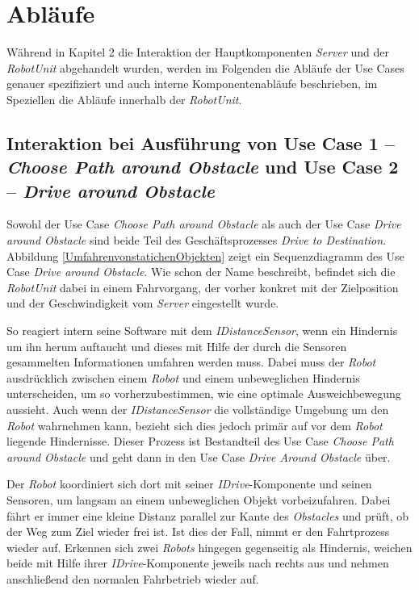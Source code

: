 \section{Abläufe}

Während in Kapitel 2 die Interaktion der Hauptkomponenten \emph{Server} und der \emph{RobotUnit} abgehandelt wurden, werden im Folgenden die Abläufe der Use Cases genauer spezifiziert und auch interne Komponentenabläufe beschrieben, im Speziellen die Abläufe innerhalb der \emph{RobotUnit}.
	
	\subsection*{Interaktion bei Ausführung von Use Case 1 – \emph{Choose Path around Obstacle} und Use Case 2 – \emph{Drive around Obstacle}}
	Sowohl der Use Case \emph{Choose Path around Obstacle} als auch der Use Case \emph{Drive around Obstacle} sind beide Teil des Geschäftsprozesses \emph{Drive to Destination}. Abbildung \ref{UmfahrenvonstatichenObjekten} zeigt ein Sequenzdiagramm des Use Case \emph{Drive around Obstacle}. Wie schon der Name beschreibt, befindet sich die \emph{RobotUnit} dabei in einem Fahrvorgang, der vorher konkret mit der Zielposition und der Geschwindigkeit vom \emph{Server} eingestellt wurde. 
	
	So reagiert intern seine Software mit dem \emph{IDistanceSensor}, wenn ein Hindernis um ihn herum auftaucht und dieses mit Hilfe der durch die Sensoren gesammelten Informationen umfahren werden muss. Dabei muss der \emph{Robot} ausdrücklich zwischen einem \emph{Robot} und einem unbeweglichen Hindernis unterscheiden, um so vorherzubestimmen, wie eine optimale Ausweichbewegung aussieht. Auch wenn der \emph{IDistanceSensor} die vollständige Umgebung um den \emph{Robot} wahrnehmen kann, bezieht sich dies jedoch primär auf vor dem \emph{Robot} liegende Hindernisse. Dieser Prozess ist Bestandteil des Use Case \emph{Choose Path around Obstacle} und geht dann in den Use Case \emph{Drive Around Obstacle} über. 
	
	Der \emph{Robot} koordiniert sich dort mit seiner \emph{IDrive}-Komponente und seinen Sensoren, um langsam an einem unbeweglichen Objekt vorbeizufahren. Dabei fährt er immer eine kleine Distanz parallel zur Kante des \emph{Obstacles} und prüft, ob der Weg zum Ziel wieder frei ist. Ist dies der Fall, nimmt er den Fahrtprozess wieder auf. Erkennen sich zwei \emph{Robots} hingegen gegenseitig als Hindernis, weichen beide mit Hilfe ihrer \emph{IDrive}-Komponente jeweils nach rechts aus und nehmen anschließend den normalen Fahrbetrieb wieder auf. \\
	
